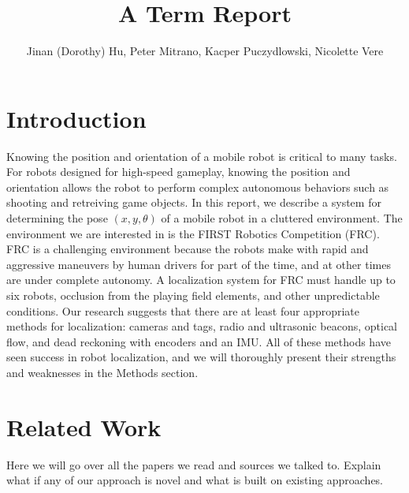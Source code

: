 \documentclass{article}
\begin{document}
\title{A Term Report}
\author{Jinan (Dorothy) Hu, Peter Mitrano, Kacper Puczydlowski, Nicolette Vere}

\maketitle{}

\section{Introduction}

Knowing the position and orientation of a mobile robot is critical to many tasks. For robots designed for high-speed gameplay, knowing the position and orientation allows the robot to perform complex autonomous behaviors such as shooting and retreiving game objects. In this report, we describe a system for determining the pose $(x, y, \theta)$ of a mobile robot in a cluttered environment. The environment we are interested in is the FIRST Robotics Competition (FRC). FRC is a challenging environment because the robots make with rapid and aggressive maneuvers by human drivers for part of the time, and at other times are under complete autonomy. A localization system for FRC must handle up to six robots, occlusion from the playing field elements, and other unpredictable conditions. Our research suggests that there are at least four appropriate methods for localization: cameras and tags, radio and ultrasonic beacons, optical flow, and dead reckoning with encoders and an IMU. All of these methods have seen success in robot localization, and we will thoroughly present their strengths and weaknesses in the Methods section.

\section{Related Work}

Here we will go over all the papers we read and sources we talked to. Explain what if any of our approach is novel and what is built on existing approaches.
\end{document}
